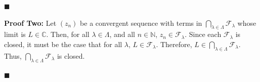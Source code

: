 \documentclass{article}
\begin{document}
\hfill$\blacksquare$

\vspace{3mm}

\noindent\textbf{Proof Two:}  Let $(z_n)$ be a convergent sequence with terms in $\bigcap_{\lambda\in\Lambda}\mathcal{F}_{\lambda}$ whose limit is $L\in\mathbb{C}$.  Then, for all $\lambda\in\Lambda$, and all $n\in\mathbb{N}$, $z_n\in\mathcal{F}_{\lambda}$.  Since each $\mathcal{F}_{\lambda}$ is closed, it must be the case that for all $\lambda$, $L\in\mathcal{F}_{\lambda}$.  Therefore, $L\in \bigcap_{\lambda\in\Lambda}\mathcal{F}_{\lambda}$.  Thus, $\bigcap_{\lambda\in\Lambda}\mathcal{F}_{\lambda}$ is closed.

\hfill$\blacksquare$
\end{document}
